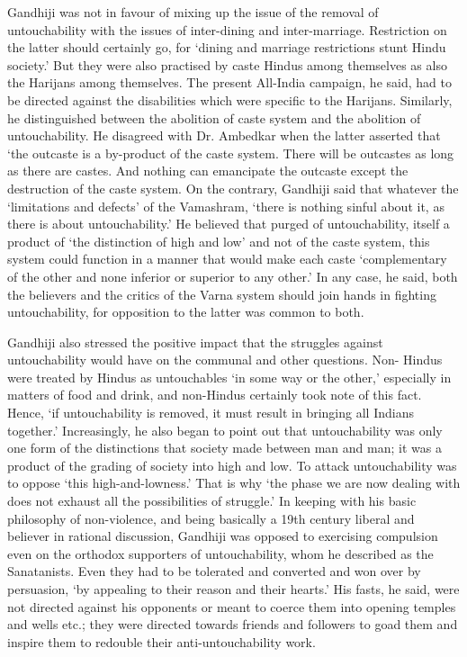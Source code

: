 Gandhiji was not in favour of mixing up the issue of the removal of untouchability with the issues of inter-dining and inter-marriage. Restriction on the latter should certainly go, for `dining and marriage restrictions stunt Hindu society.' But they were also practised by caste Hindus among themselves as also the Harijans among themselves. The present All-India campaign, he said, had to be directed against the disabilities which were specific to the Harijans. Similarly, he distinguished between the abolition of caste system and the abolition of untouchability. He disagreed with Dr. Ambedkar when the latter asserted that `the outcaste is a by-product of the caste system. There will be outcastes as long as there are castes. And nothing can emancipate the outcaste except the destruction of the caste system. On the contrary, Gandhiji said that whatever the `limitations and defects' of the Vamashram, `there is nothing sinful about it, as there is about untouchability.' He believed that purged of untouchability, itself a product of `the distinction of high and low' and not of the caste system, this system could function in a manner that would make each caste `complementary of the other and none inferior or superior to any other.' In any case, he said, both the believers and the critics of the Varna system should join hands in fighting untouchability, for opposition to the latter was common to both. 

Gandhiji also stressed the positive impact that the struggles against untouchability would have on the communal and other questions. Non- Hindus were treated by Hindus as untouchables `in some way or the other,' especially in matters of food and drink, and non-Hindus certainly took note of this fact. Hence, `if untouchability is removed, it must result in bringing all Indians together.' Increasingly, he also began to point out that untouchability was only one form of the distinctions that society made between man and man; it was a product of the grading of society into high and low. To attack untouchability was to oppose `this high-and-lowness.' That is why `the phase we are now dealing with does not exhaust all the possibilities of struggle.' In keeping with his basic philosophy of non-violence, and being basically a 19th century liberal and believer in rational discussion, Gandhiji was opposed to exercising compulsion even on the orthodox supporters of untouchability, whom he described as the Sanatanists. Even they had to be tolerated and converted and won over by persuasion, `by appealing to their reason and their hearts.' His fasts, he said, were not directed against his opponents or meant to coerce them into opening temples and wells etc.; they were directed towards friends and followers to goad them and inspire them to redouble their anti-untouchability work. 

